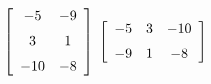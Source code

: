 {$\left[ \begin {array}{cc} -5&-9\\\noalign{\medskip}3&1
\\\noalign{\medskip}-10&-8\end {array} \right] $}
{$\left[ \begin {array}{ccc} -5&3&-10\\\noalign{\medskip}-9&1&-8
\end {array} \right]$}


